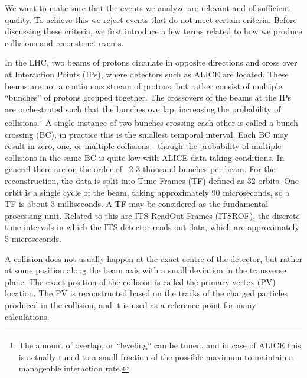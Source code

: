  \label{sec:eventsel}
    We want to make sure that the events we analyze are relevant and of sufficient quality. To achieve this we reject events that do not meet certain criteria. Before discussing these criteria, we first introduce a few terms related to how we produce collisions and reconstruct events. 
    
    In the LHC, two beams of protons circulate in opposite directions and cross over at Interaction Points (IPs), where detectors such as ALICE are located. These beams are not a continuous stream of protons, but rather consist of multiple ``bunches'' of protons grouped together. The crossovers of the beams at the IPs are orchestrated such that the bunches overlap, increasing the probability of collisions.\footnote{The amount of overlap, or ``leveling'' can be tuned, and in case of ALICE this is actually tuned to a small fraction of the possible maximum to maintain a manageable interaction rate.} A single instance of two bunches crossing each other is called a bunch crossing (BC), in practice this is the smallest temporal interval. Each BC may result in zero, one, or multiple collisions - though the probability of multiple collisions in the same BC is quite low with ALICE data taking conditions.  In general there are on the order of ~2-3 thousand bunches per beam. For the reconstruction, the data is split into Time Frames (TF) defined as 32 orbits. One orbit is a single  cycle of the beam, taking approximately 90 microseconds, so a TF is about 3 milliseconds. A TF may be considered as the fundamental processing unit. Related to this are ITS ReadOut Frames (ITSROF), the discrete time intervals in which the ITS detector reads out data, which are approximately 5 microseconds. 

    A collision does not usually happen at the exact centre of the detector, but rather at some position along the beam axis with a small deviation in the transverse plane. The exact position of the collision is called the primary vertex (PV) location. The PV is reconstructed based on the tracks of the charged particles produced in the collision, and it is used as a reference point for many calculations. 

